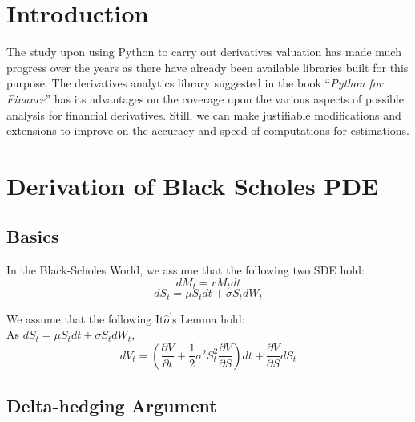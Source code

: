 \section{Introduction}
The study upon using Python to carry out derivatives valuation has made much progress over the years as there have already been available libraries built for this purpose. The derivatives analytics library suggested in the book ``\emph{Python for Finance}'' has its advantages on the coverage upon the various aspects of possible analysis for financial derivatives. Still, we can make justifiable modifications and extensions to improve on the accuracy and speed of computations for estimations. 
\\

\newpage

\section{Derivation of Black Scholes PDE}

\subsection{Basics}
\begin{center}
In the Black-Scholes World, we assume that the following two SDE hold:
$$dM_{t}  = rM_{t}dt$$
$$dS_{t}  = \mu S_{t}dt + \sigma S_{t} dW_{t}$$

We assume that the following It$\hat{o}^{\prime}$s Lemma hold:\\[4mm]
As $dS_{t} = \mu S_{t}dt + \sigma S_{t}dW_{t}$,
$$dV_{t} = (\frac{\partial V}{\partial t}+\frac{1}{2}\sigma^{2}S_{t}^{2}\frac{\partial V}{\partial S})dt + \frac{\partial V}{\partial S}dS_{t}$$
\end{center}
\newpage

\subsection{Delta-hedging Argument}

